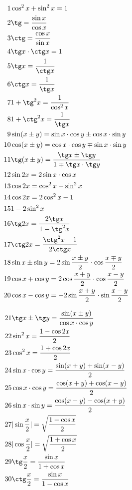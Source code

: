 \documentclass{article}
\begin{document}
\begin{align*}
  1 &\cos^2 x + \sin^2 x = 1\\
  2 &\tg = \frac{\sin x}{\cos x}\\
  3 &\ctg = \frac{\cos x}{\sin x}\\
  4 &\tg x \cdot \ctg x = 1\\
  5 &\tg x = \frac{1}{\ctg x}\\
  6 &\ctg x = \frac{1}{\tg x}\\
  7 &1 + \tg^2 x = \frac{1}{\cos^2 x}\\
  8 &1 + \ctg^2 x = \frac{1}{\tg x}\\
  9 &\sin (x\pm y) = \sin x \cdot \cos y \pm \cos x \cdot \sin y\\
  10&\cos (x\pm y) = \cos x \cdot \cos y \mp \sin x \cdot \sin y\\
  11&\tg (x\pm y) = \frac{\tg x \pm \tg y}{1 \mp \tg x \cdot \tg y}\\
  12&\sin 2x = 2\sin x \cdot \cos x\\
  13&\cos 2x = \cos^2 x - \sin^2 x\\
  14&\cos 2x = 2\cos^2 x - 1\\
  15&1 - 2\sin^2 x\\
  16&\tg 2x = \frac{2\tg x}{1 - \tg^2 x}\\
  17&\ctg 2x = \frac{\ctg^2 x - 1}{2\ctg x}\\
  18&\sin x \pm \sin y = 2\sin \frac{x\pm y}{2} \cdot \cos \frac{x\mp y}{2}\\
  19&\cos x + \cos y = 2\cos\frac{x + y}{2} \cdot \cos\frac{x - y}{2}\\
  20&\cos x - \cos y = -2\sin\frac{x + y}{2} \cdot \sin\frac{x - y}{2}\\
\end{align*} 



\begin{align*}
  21&\tg x \pm \tg y = \frac{\sin (x \pm y)}{\cos x \cdot \cos y}\\
  22&\sin^2 x = \frac{1 - \cos 2x}{2}\\
  23&\cos^2 x = \frac{1 + \cos 2x}{2}\\
  24&\sin x \cdot \cos y = \frac{\sin (x+y) + \sin (x-y)}{2}\\
  25&\cos x \cdot \cos y = \frac{\cos (x+y) + \cos (x-y)}{2}\\
  26&\sin x \cdot \sin y = \frac{\cos (x-y) - \cos (x+y)}{2}\\
  27&|\sin \frac{x}{2}| = \sqrt{\frac{1 - \cos x}{2}}\\
  28&|\cos \frac{x}{2}| = \sqrt{\frac{1 + \cos x}{2}}\\
  29&\tg \frac{x}{2} = \frac{\sin x}{1 + \cos x}\\
  30&\ctg \frac{x}{2} = \frac{\sin x}{1 - \cos x}\\
\end{align*} 
\end{document}
